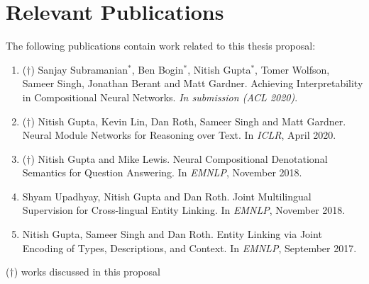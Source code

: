 \documentclass{article}
\begin{document}
\section*{Relevant Publications}

The following publications contain work related to this thesis proposal:

\begin{enumerate}


\item ($\dagger$) Sanjay Subramanian$^{*}$, Ben Bogin$^{*}$, Nitish Gupta$^{*}$, Tomer Wolfson, Sameer Singh, Jonathan Berant and Matt Gardner. Achieving Interpretability in Compositional Neural Networks. \textit{In submission (ACL 2020)}.

\item ($\dagger$) Nitish Gupta, Kevin Lin, Dan Roth, Sameer Singh and Matt Gardner. Neural Module Networks for Reasoning over Text. In \textit{ICLR}, April 2020.

\item ($\dagger$) Nitish Gupta and Mike Lewis. Neural Compositional Denotational Semantics for Question Answering. In \textit{EMNLP}, November 2018.

\item Shyam Upadhyay, Nitish Gupta and Dan Roth. Joint Multilingual Supervision for Cross-lingual Entity Linking. In \textit{EMNLP}, November 2018.

\item Nitish Gupta, Sameer Singh and Dan Roth. Entity Linking via Joint Encoding of Types, Descriptions, and Context. In \textit{EMNLP}, September 2017.

\end{enumerate}

\noindent
($\dagger$) works discussed in this proposal



\end{document}
